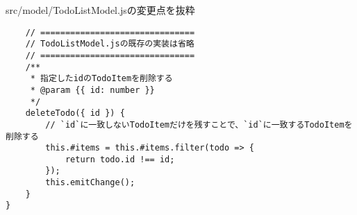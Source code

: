 \begin{listtitle}
src/model/TodoListModel.jsの変更点を抜粋
\end{listtitle}
\begin{lstlisting}
    // ===============================
    // TodoListModel.jsの既存の実装は省略
    // ===============================
    /**
     * 指定したidのTodoItemを削除する
     * @param {{ id: number }}
     */
    deleteTodo({ id }) {
        // `id`に一致しないTodoItemだけを残すことで、`id`に一致するTodoItemを削除する
        this.#items = this.#items.filter(todo => {
            return todo.id !== id;
        });
        this.emitChange();
    }
}
\end{lstlisting}
\listend

